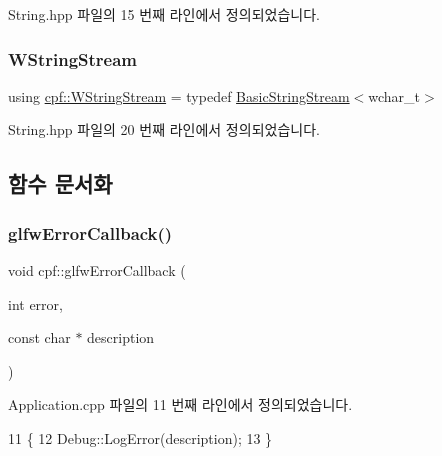 String.\+hpp 파일의 15 번째 라인에서 정의되었습니다.

\mbox{\label{namespacecpf_a7e79dec7a6790331bee7ef1e85dafba6}} 
\subsubsection{\texorpdfstring{W\+String\+Stream}{WStringStream}}
{\footnotesize\ttfamily using \hyperlink{namespacecpf_a7e79dec7a6790331bee7ef1e85dafba6}{cpf\+::\+W\+String\+Stream} = typedef \hyperlink{namespacecpf_a1fe334b3d2422535a1cfe51785d98cb8}{Basic\+String\+Stream}$<$wchar\+\_\+t$>$}



String.\+hpp 파일의 20 번째 라인에서 정의되었습니다.



\subsection{함수 문서화}
\mbox{\label{namespacecpf_a2aa8b9856909234833858da9b6c466dd}} 
\subsubsection{\texorpdfstring{glfw\+Error\+Callback()}{glfwErrorCallback()}}
{\footnotesize\ttfamily void cpf\+::glfw\+Error\+Callback (\begin{DoxyParamCaption}\item[{int}]{error,  }\item[{const char $\ast$}]{description }\end{DoxyParamCaption})}



Application.\+cpp 파일의 11 번째 라인에서 정의되었습니다.


\begin{DoxyCode}
11                                                                \{
12         Debug::LogError(description);
13     \}
\end{DoxyCode}
\mbox{\label{namespacecpf_a1167b3088599fca20112d444efd29154}} 

